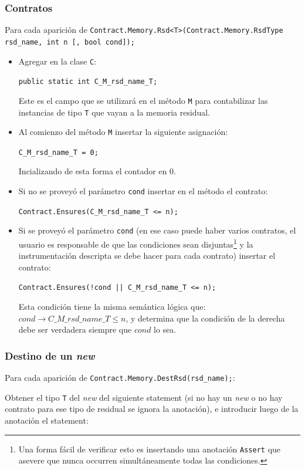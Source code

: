 \documentclass[12pt,a4paper]{article}
\newcommand\mono[1]{\texttt{#1}}
\begin{document}
			\subsubsection{Contratos}
				Para cada aparición de \mono{Contract.Memory.Rsd<T>(Contract.Memory.RsdType \\ rsd\_name, int n [, bool cond]);}
				\begin{itemize}
					\item
						Agregar en la clase \mono{C}:

						\mono{public static int C\_M\_rsd\_name\_T;}

						Este es el campo que se utilizará en el método \mono{M} para contabilizar las instancias de tipo \mono{T} que vayan a la memoria residual.
					\item
						Al comienzo del método \mono{M} insertar la siguiente asignación:

						\mono{C\_M\_rsd\_name\_T = 0;}

						Incializando de esta forma el contador en 0.
					\item
						Si no se proveyó el parámetro \mono{cond} insertar en el método el contrato:

						\mono{Contract.Ensures(C\_M\_rsd\_name\_T <= n);}
					\item
						Si se proveyó el parámetro \mono{cond} (en ese caso puede haber varios contratos, el usuario es responsable de que las condiciones sean disjuntas\footnote{Una forma fácil de verificar esto es insertando una anotación \mono{Assert} que asevere que nunca occurren simultáneamente todas las condiciones.} y la instrumentación descripta se debe hacer para cada contrato) insertar el contrato:

						\mono{Contract.Ensures(!cond || C\_M\_rsd\_name\_T <= n);}

						Esta condición tiene la misma semántica lógica que: $cond \rightarrow C\_M\_rsd\_name\_T \leq n$, y determina que la condición de la derecha debe ser verdadera siempre que $cond$ lo sea.
				\end{itemize}
			\subsubsection{Destino de un \textit{new}}
				Para cada aparición de \mono{Contract.Memory.DestRsd(rsd\_name);}:

				Obtener el tipo \mono{T} del \textit{new} del siguiente statement (si no hay un \textit{new} o no hay contrato para ese tipo de residual se ignora la anotación), e introducir luego de la anotación el statement:
\end{document}
